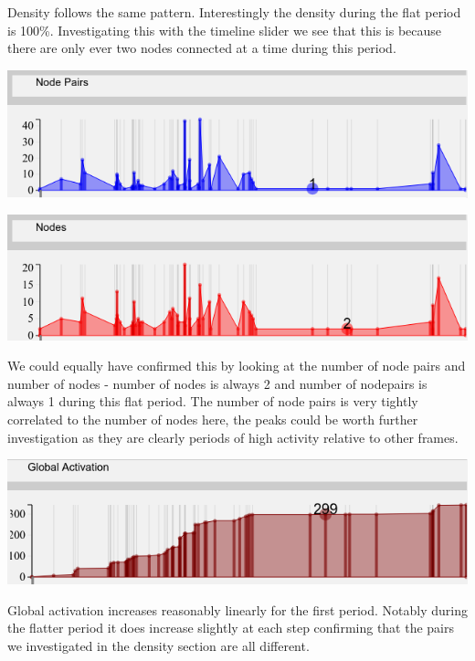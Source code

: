 Density follows the same pattern. Interestingly the density during the flat period is 100\%. Investigating this with the timeline slider we see that this is because there are only ever two nodes connected at a time during this period. 
\begin{center}
\includegraphics[trim={0 0 0 0}, width=140mm]{./Figures/marieBoucherNodePairs.png}
\end{center}
\begin{center}
\includegraphics[trim={0 0 0 0}, width=140mm]{./Figures/marieBoucherNodes.png}
\end{center}
We could equally have confirmed this by looking at the number of node pairs and number of nodes - number of nodes is always 2 and number of nodepairs is always 1 during this flat period. The number of node pairs is very tightly correlated to the number of nodes here, the peaks could be worth further investigation as they are clearly periods of high activity relative to other frames.

\begin{center}
\includegraphics[trim={0 0 0 0}, width=140mm]{./Figures/marieBoucherGlobalActivation.png}
\end{center}
Global activation increases reasonably linearly for the first period. Notably during the flatter period it does increase slightly at each step confirming that the pairs we investigated in the density section are all different. 

